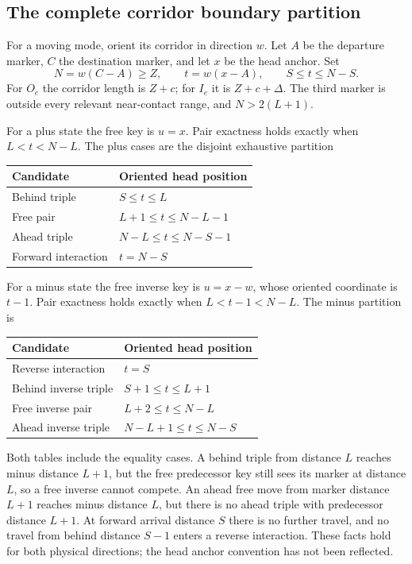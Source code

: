 \documentclass[11pt,a4paper]{article}
\numberwithin{equation}{section}
\begin{document}
\subsection{The complete corridor boundary partition}
For a moving mode, orient its corridor in direction $w$. Let $A$ be the departure marker, $C$ the destination marker, and let $x$ be the head anchor. Set
\[
 N=w(C-A)\ge Z,\qquad t=w(x-A),\qquad S\le t\le N-S.
\]
For $O_e$ the corridor length is $Z+c$; for $I_e$ it is $Z+c+\Delta$. The third marker is outside every relevant near-contact range, and $N>2(L+1)$.

For a plus state the free key is $u=x$. Pair exactness holds exactly when $L<t<N-L$. The plus cases are the disjoint exhaustive partition
\begin{center}
\begin{tabular}{ll}\toprule
Candidate & Oriented head position\\\midrule
Behind triple & $S\le t\le L$\\
Free pair & $L+1\le t\le N-L-1$\\
Ahead triple & $N-L\le t\le N-S-1$\\
Forward interaction & $t=N-S$\\\bottomrule
\end{tabular}
\end{center}
For a minus state the free inverse key is $u=x-w$, whose oriented coordinate is $t-1$. Pair exactness holds exactly when $L<t-1<N-L$. The minus partition is
\begin{center}
\begin{tabular}{ll}\toprule
Candidate & Oriented head position\\\midrule
Reverse interaction & $t=S$\\
Behind inverse triple & $S+1\le t\le L+1$\\
Free inverse pair & $L+2\le t\le N-L$\\
Ahead inverse triple & $N-L+1\le t\le N-S$\\\bottomrule
\end{tabular}
\end{center}
Both tables include the equality cases. A behind triple from distance $L$ reaches minus distance $L+1$, but the free predecessor key still sees its marker at distance $L$, so a free inverse cannot compete. An ahead free move from marker distance $L+1$ reaches minus distance $L$, but there is no ahead triple with predecessor distance $L+1$. At forward arrival distance $S$ there is no further travel, and no travel from behind distance $S-1$ enters a reverse interaction. These facts hold for both physical directions; the head anchor convention has not been reflected.
\end{document}
